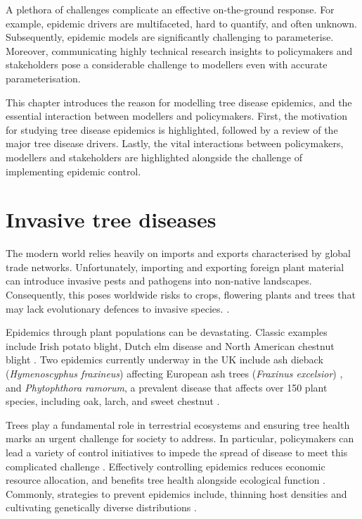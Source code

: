 A plethora of challenges complicate an effective on-the-ground response. 
For example, epidemic drivers are multifaceted, hard to quantify, and often unknown. 
Subsequently, epidemic models are significantly challenging to parameterise. Moreover, communicating
highly technical research insights to policymakers and stakeholders pose a considerable challenge
to modellers even with accurate parameterisation. 

This chapter introduces the reason for modelling tree disease epidemics, and the essential interaction between modellers and policymakers.
First, the motivation for studying tree disease epidemics is highlighted, 
followed by a review of the major tree disease drivers.
Lastly, the vital interactions between policymakers, modellers and stakeholders are highlighted alongside
the challenge of implementing epidemic control.

\newpage

\section{Invasive tree diseases}

The modern world relies heavily on imports and exports characterised by global trade networks. 
Unfortunately, importing and exporting foreign plant material can introduce invasive pests and pathogens
into non-native landscapes. Consequently, this poses worldwide risks to crops, flowering plants
and trees that may lack evolutionary defences to invasive species. \cite{doi:10.1002/9781444329988.ch8}. 

Epidemics through plant populations can be devastating.
Classic examples include Irish potato blight, Dutch elm disease \cite{doi:10.1111/j.1365-3059.2010.02391.x} 
and North American chestnut blight \cite{doi:10.1002/9780470535486.ch7}.
Two epidemics currently underway in the UK include ash dieback (\textit{Hymenoscyphus fraxineus}) affecting European ash trees (\textit{Fraxinus excelsior})
\cite{ash-dieback-costs}, and \textit{Phytophthora ramorum}, a prevalent disease that affects over 150 plant species, including oak, 
larch, and sweet chestnut \cite{p.ramourum}.

Trees play a fundamental role in terrestrial ecosystems \cite{boyd2013consequence} and ensuring tree health marks an urgent challenge for society to address.
In particular, policymakers can lead a variety of control initiatives to impede the spread of disease to meet this complicated challenge \cite{Gilligan-disease-management}. 
Effectively controlling epidemics reduces economic resource allocation, and benefits tree health alongside ecological function \cite{ash-dieback-costs, freer2017tree, boyd2013consequence, tyrvainen2005benefits}. 
Commonly, strategies to prevent epidemics include, thinning host densities \cite{pietzsch2021effect, resiliency-density-reductions} and cultivating genetically diverse distributions \cite{doi:10.1094/PD-89-0969, genetic-heterogeneity, huang1980importance}.

